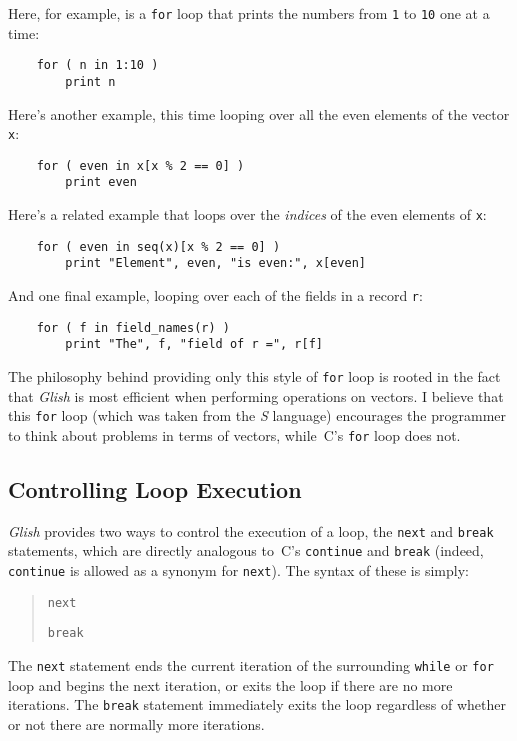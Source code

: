 Here, for example, is a {\tt for} loop that prints the numbers from
{\tt 1} to {\tt 10} one at a time:
\begin{verbatim}
    for ( n in 1:10 )
        print n
\end{verbatim}

Here's another example, this time looping over all the even elements of
the vector {\tt x}:
\begin{verbatim}
    for ( even in x[x % 2 == 0] )
        print even
\end{verbatim}

Here's a related example that loops over the {\em indices} of the
even elements of {\tt x}:
\begin{verbatim}
    for ( even in seq(x)[x % 2 == 0] )
        print "Element", even, "is even:", x[even]
\end{verbatim}

And one final example, looping over each of the fields in a record {\tt r}:
\begin{verbatim}
    for ( f in field_names(r) )
        print "The", f, "field of r =", r[f]
\end{verbatim}

The philosophy behind providing only this style of {\tt for} loop is
rooted in the fact that {\em Glish} is most efficient when performing operations
on vectors.  I believe that this {\tt for} loop (which was
taken from the {\em S} language) encourages the programmer to think
about problems in terms of vectors, while~C's {\tt for} loop
does not.

\subsection{Controlling Loop Execution}

{\em Glish} provides two ways to control the execution of a loop,
the {\tt next}
and {\tt break}
statements, which are directly analogous to~C's
{\tt continue} and {\tt break} (indeed,
{\tt continue} is allowed as
a synonym for {\tt next}).  The syntax of these is simply:
\begin{quote}
    {\tt next}

    {\tt break}
\end{quote}

The {\tt next} statement ends the current iteration of 
the surrounding {\tt while}
or {\tt for} loop and begins the next iteration, or exits the loop
if there are no more iterations.  The {\tt break} statement 
immediately exits the
loop regardless of whether or not there are normally  more iterations.

